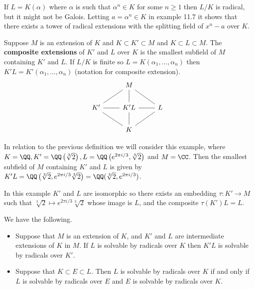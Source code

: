 \documentclass[12pt, a4paper]{article}
\begin{document}
\begin{mdexample}
    If \(L = K(\alpha)\) where \(\alpha\) is such that \(\alpha^n \in K\) for some \(n\geq 1\) then \(L/K\) is radical, but it might not be Galois. Letting \(a=\alpha^n \in K\) in example 11.7 it shows that there exists a tower of radical extensions with the splitting field of \(x^n-a\) over \(K\).
\end{mdexample}

\begin{definition}
    Suppose \(M\) is an extension of \(K\) and \(K \subset K'\subset M\) and \(K \subset L \subset M\). The \textbf{composite extensions} of \(K'\) and \(L\) over \(K\) is the smallest subfield of \(M\) containing \(K'\) and \(L\). If \(L/K\) is finite so \(L=K(\alpha_1,\ldots,\alpha_n)\) then \(K'L=K'(\alpha_1,\ldots,\alpha_n)\) (notation for composite extension).
    \[\begin{tikzcd}
        & M \\
        {K'} & {K'L} & L \\
        & K
        \arrow[no head, from=2-2, to=1-2]
        \arrow[no head, from=3-2, to=2-1]
        \arrow[no head, from=3-2, to=2-2]
        \arrow[no head, from=2-1, to=2-2]
        \arrow[no head, from=2-2, to=2-3]
        \arrow[no head, from=2-3, to=3-2]
        \arrow[no head, from=2-1, to=1-2]
        \arrow[no head, from=1-2, to=2-3]
    \end{tikzcd}\]
\end{definition}

\begin{mdexample}
    In relation to the previous definition we will consider this example, where \(K = \QQ, K'=\QQ\left( \sqrt[3]{2} \right), L = \QQ\left( e^{2\pi i/3},\sqrt[3]{2} \right)\) and \(M=\CC\). Then the smallest subfield of \(M\) containing \(K'\) and \(L\) is given by \(K'L = \QQ\left( \sqrt[3]{2},e^{2\pi i/3}\sqrt[3]{2} \right) = \QQ(\sqrt[3]{2},e^{2\pi i/3})\).

    In this example \(K'\) and \(L\) are isomorphic so there exists an embedding \(\tau: K' \to M\) such that \(\sqrt[3]{2} \mapsto e^{2\pi i /3}\sqrt[3]{2}\) whose image is \(L\), and the composite \(\tau(K')L=L\).
\end{mdexample}

\begin{mdlemma}
    We have the following.
    \begin{itemize}
        \item Suppose that \(M\) is an extension of \(K\), and \(K'\) and \(L\) are intermediate extensions of \(K\) in \(M\). If \(L\) is solvable by radicals over \(K\) then \(K'L\) is solvable by radicals over \(K'\).
        \item Suppose that \(K \subset E \subset L\). Then \(L\) is solvable by radicals over \(K\) if and only if \(L\) is solvable by radicals over \(E\) and \(E\) is solvable by radicals over \(K\).
    \end{itemize}
\end{mdlemma}
\end{document}
